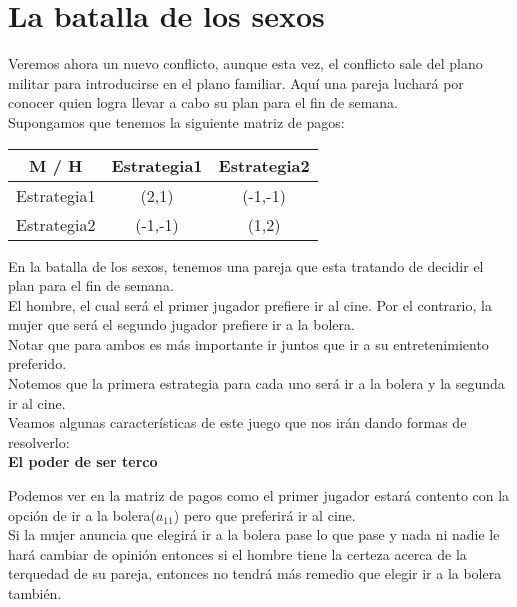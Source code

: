 \documentclass[10pt,a4paper]{book}
\begin{document}
\section{La batalla de los sexos}

Veremos ahora un nuevo conflicto, aunque esta vez, el conflicto sale del plano militar para introducirse en el plano familiar. Aquí una pareja luchará por conocer quien logra llevar a cabo su plan para el fin de semana.\\

Supongamos que tenemos la siguiente matriz de pagos:\\


\begin{center}
	\begin{tabular}{|c|c|c|}
		\hline
		M / H & Estrategia1 & Estrategia2 \\
		\hline
		Estrategia1 & (2,1) & (-1,-1) \\
		\hline
		Estrategia2 & (-1,-1) & (1,2) \\
		\hline
	\end{tabular}
\end{center}


En la batalla de los sexos, tenemos una pareja que esta tratando de decidir el plan para el fin de semana.\\
El hombre, el cual será el primer jugador prefiere ir al cine. Por el contrario, la mujer que será el segundo jugador prefiere ir a la bolera.\\

Notar que para ambos es más importante ir juntos que ir a su entretenimiento preferido.\\

Notemos que la primera estrategia para cada uno será ir a la bolera y la segunda ir al cine. \\

Veamos algunas características de este juego que nos irán dando formas de resolverlo:\\

\textbf{El poder de ser terco}

Podemos ver en la matriz de pagos como el primer jugador estará contento con la opción de ir a la bolera($a_{11}$) pero que preferirá ir al cine.\\

Si la mujer anuncia que elegirá ir a la bolera pase lo que pase y nada ni nadie le hará cambiar de opinión entonces si el hombre tiene la certeza acerca de la terquedad de su pareja, entonces no tendrá más remedio que elegir ir a la bolera también.\\
\end{document}
